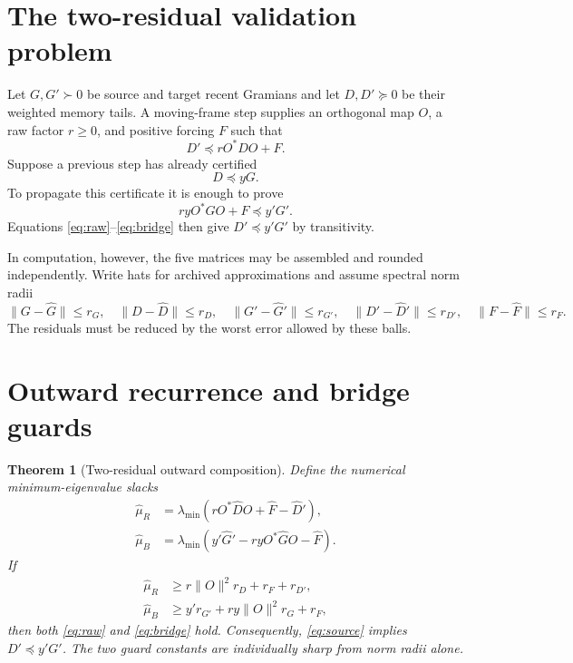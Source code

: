 \documentclass[12pt]{article}
\newtheorem{theorem}{Theorem}
\begin{document}
\section{The two-residual validation problem}
Let $G,G'\succ0$ be source and target recent Gramians and let $D,D'\succeq0$
be their weighted memory tails.  A moving-frame step supplies an orthogonal
map $O$, a raw factor $r\geq0$, and positive forcing $F$ such that
\begin{equation}\label{eq:raw}
 D'\preceq rO^*DO+F.
\end{equation}
Suppose a previous step has already certified
\begin{equation}\label{eq:source}
 D\preceq yG.
\end{equation}
To propagate this certificate it is enough to prove
\begin{equation}\label{eq:bridge}
 ryO^*GO+F\preceq y'G'.
\end{equation}
Equations \eqref{eq:raw}--\eqref{eq:bridge} then give
$D'\preceq y'G'$ by transitivity.

In computation, however, the five matrices may be assembled and rounded
independently.  Write hats for archived approximations and assume spectral
norm radii
\[
 \|G-\widehat G\|\leq r_G,
 \quad \|D-\widehat D\|\leq r_D,
 \quad \|G'-\widehat G'\|\leq r_{G'},
 \quad \|D'-\widehat D'\|\leq r_{D'},
 \quad \|F-\widehat F\|\leq r_F.
\]
The residuals must be reduced by the worst error allowed by these balls.

\section{Outward recurrence and bridge guards}
\begin{theorem}[Two-residual outward composition]\label{thm:two}
Define the numerical minimum-eigenvalue slacks
\begin{align*}
 \widehat\mu_R
 &=\lambda_{\min}(rO^*\widehat DO+\widehat F-\widehat D'),\\
 \widehat\mu_B
 &=\lambda_{\min}(y'\widehat G'-ryO^*\widehat GO-\widehat F).
\end{align*}
If
\begin{align}
 \widehat\mu_R&\geq r\|O\|^2r_D+r_F+r_{D'},\label{eq:rawguard}\\
 \widehat\mu_B&\geq y'r_{G'}+ry\|O\|^2r_G+r_F,\label{eq:bridgeguard}
\end{align}
then both \eqref{eq:raw} and \eqref{eq:bridge} hold.  Consequently,
\eqref{eq:source} implies $D'\preceq y'G'$.  The two guard constants are
individually sharp from norm radii alone.
\end{theorem}
\end{document}
